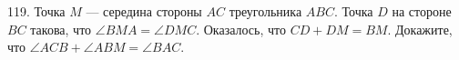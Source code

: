 119. Точка $M$ --- середина стороны $AC$ треугольника $ABC.$ Точка $D$ на стороне $BC$ такова, что $\angle BMA=\angle DMC.$ Оказалось, что $CD+DM=BM.$ Докажите, что $\angle ACB+\angle ABM=\angle BAC.$\\

